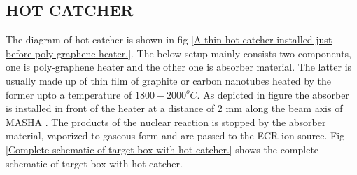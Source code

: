 \documentclass[12pt]{article}
\begin{document}
\subsection{HOT CATCHER}
The diagram of hot catcher is shown in fig \ref{A thin hot catcher installed just before poly-graphene heater.}. The below setup mainly consists two components, one is poly-graphene heater and the other one is absorber material. The latter is usually made up of thin film of graphite or carbon nanotubes heated by the former upto a temperature of $1800-2000^oC$. As depicted in figure the absorber is installed in front of the heater at a distance of 2 mm along the beam axis of MASHA \cite{mamatova2019study}. The products of the nuclear reaction is stopped by the absorber material, vaporized to gaseous form and are passed to the ECR ion source. Fig \ref{Complete schematic of target box with hot catcher.} shows the complete schematic of target box with hot catcher.
\end{document}
